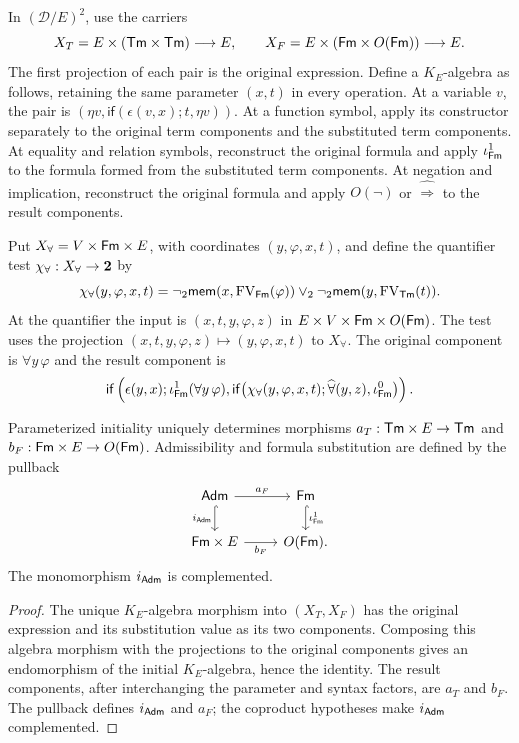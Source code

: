 In $(\mathcal D/E)^2$, use the carriers
\[
 X_T=E\times(\mathsf{Tm}\times\mathsf{Tm})\longrightarrow E,
 \qquad
 X_F=E\times(\mathsf{Fm}\times O(\mathsf{Fm}))\longrightarrow E.
\]
The first projection of each pair is the original expression.
Define a $K_E$-algebra as follows, retaining the same parameter
$(x,t)$ in every operation. At a variable $v$, the pair is
$(\eta v,\mathsf{if}(\epsilon(v,x);t,\eta v))$.
At a function symbol, apply its constructor separately to the
original term components and the substituted term components.
At equality and relation symbols, reconstruct the original formula
and apply $\iota^{1}_{\mathsf{Fm}}$ to the formula formed from the substituted
term components. At negation and implication, reconstruct the
original formula and apply $O(\neg)$ or
$\widehat{\Rightarrow}$ to the result components.

Put $X_{\forall}=V\times\mathsf{Fm}\times E$, with coordinates $(y,\varphi,x,t)$,
and define the quantifier test $\chi_{\forall}:X_{\forall}\to\mathbf 2$ by
\[
 \chi_{\forall}(y,\varphi,x,t)=
 \neg_2\mathsf{mem}(x,\operatorname{FV}_{\mathsf{Fm}}(\varphi))
 \vee_2\neg_2\mathsf{mem}(y,\operatorname{FV}_{\mathsf{Tm}}(t)).
\]
At the quantifier the input is $(x,t,y,\varphi,z)$ in
$E\times V\times\mathsf{Fm}\times O(\mathsf{Fm})$. The test uses the projection
$(x,t,y,\varphi,z)\mapsto(y,\varphi,x,t)$ to $X_{\forall}$. The original
component is $\forall y\,\varphi$ and the result component is
\begin{equation}\label{eq:quantifier-fold}
 \mathsf{if}\left(\epsilon(y,x);
   \iota^{1}_{\mathsf{Fm}}(\forall y\,\varphi),
   \mathsf{if}\bigl(\chi_{\forall}(y,\varphi,x,t);
          \widehat\forall(y,z),\iota^{0}_{\mathsf{Fm}}\bigr)\right).
\end{equation}

\begin{proposition}\label{prop:categorical-substitution}
Parameterized initiality uniquely determines morphisms
$a_T:\mathsf{Tm}\times E\to\mathsf{Tm}$ and
$b_F:\mathsf{Fm}\times E\to O(\mathsf{Fm})$.
Admissibility and formula substitution are defined by the pullback
\[
\begin{tikzcd}
 \Adm\arrow[r,"a_F"]\arrow[d,hook,"i_{\Adm}"'] &
 \Fm\arrow[d,hook,"\ok_{\Fm}"]\\
 \Fm\times E\arrow[r,"b_F"'] & O(\Fm).
\end{tikzcd}
\]
The monomorphism $i_{\mathsf{Adm}}$ is complemented.
\end{proposition}
\begin{proof}
The unique $K_E$-algebra morphism into $(X_T,X_F)$ has the original
expression and its substitution value as its two components. Composing this algebra morphism with the
projections to the original components gives an endomorphism of the
initial $K_E$-algebra, hence the identity. The result components,
after interchanging the parameter
and syntax factors, are $a_T$ and $b_F$. The pullback defines
$i_{\mathsf{Adm}}$ and $a_F$; the coproduct hypotheses make $i_{\mathsf{Adm}}$ complemented.
\end{proof}

